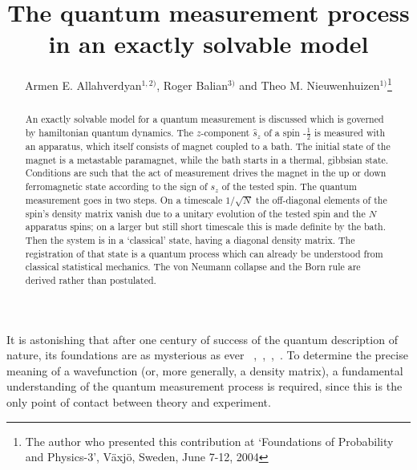 \documentclass[12pt, onecolumn, aps,prb,floatfix]{revtex4-2}
\newcommand{\half}{\frac{1}{2}}
\begin{document}
 
\title
{The quantum measurement process in an exactly solvable model}
\author{Armen E. Allahverdyan$^{1,2)}$, Roger Balian$^{3)}$
and {Theo M. Nieuwenhuizen}$^{1)}$\footnote{The author who 
presented this contribution at
`Foundations of Probability and Physics-3', V\"axj\"o, Sweden,
June 7-12, 2004}}




\begin{abstract}
An exactly solvable model for a quantum measurement is discussed 
which is governed by hamiltonian quantum dynamics. 
The $z$-component $\hat s_z$ of a spin -$\half$ is measured with an apparatus, 
which itself consists of magnet coupled to a bath.
The initial state of the magnet is a metastable paramagnet, while the bath
starts in a thermal, gibbsian state. 
Conditions are such that the act of measurement drives the magnet in the 
up or down ferromagnetic state according to the sign of  $s_z$ of 
the tested spin. The quantum measurement goes in two steps.
On a timescale $1/\sqrt{N}$ the off-diagonal elements of the spin's density matrix
vanish due to a unitary
evolution of the tested spin and the $N$ apparatus spins; on a larger but
still short timescale this is made definite by the bath.
Then the system is in a `classical' state,
having a diagonal density matrix. The registration of that state is
a quantum process which can already be understood 
from classical statistical mechanics.
The von Neumann collapse and the Born rule are derived rather than postulated.

\end{abstract}

\maketitle

It is astonishing that after one century of success of the quantum description 
of nature, its foundations are as mysterious as ever
~\cite{wh},~\cite{Vaxjo},~\cite{deMuynck},~\cite{Schlosshauer}. To determine
the precise meaning of a wavefunction (or, more generally, a density matrix),
a fundamental understanding of the quantum measurement process is required, since
this is the only point of contact between theory and experiment.
\end{document}
